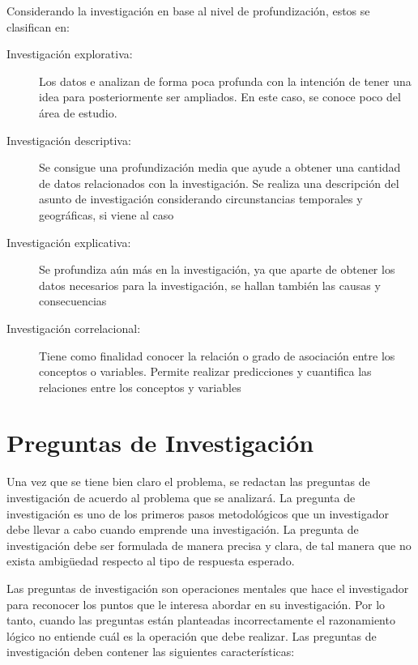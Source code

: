 Considerando la investigación en base al nivel de profundización, estos se clasifican en:

\begin{description}

    \item[Investigación explorativa:] Los datos e analizan de forma poca profunda con la intención de tener una idea para posteriormente ser ampliados. En este caso, se conoce poco del área de estudio.

    \item[Investigación descriptiva:] Se consigue una profundización media que ayude a obtener una cantidad de datos relacionados con la investigación. Se realiza una descripción del asunto de investigación considerando circunstancias temporales y geográficas, si viene al caso
    
    \item[Investigación explicativa:] Se profundiza aún más en la investigación, ya que aparte de obtener los datos necesarios para la investigación, se hallan también las causas y consecuencias
    
    \item[Investigación correlacional:] Tiene como finalidad conocer la relación o grado de asociación entre los conceptos o variables. Permite realizar predicciones y cuantifica las relaciones entre los conceptos y variables

\end{description}

\section{Preguntas de Investigación}
Una vez que se tiene bien claro el problema, se redactan las preguntas de investigación de acuerdo al problema que se analizará. La pregunta de investigación es uno de los primeros pasos metodológicos que un investigador debe llevar a cabo cuando emprende una investigación.
La pregunta de investigación debe ser formulada de manera precisa y clara, de tal manera que no exista ambigüedad respecto al tipo de respuesta esperado.\newline

Las preguntas de investigación son operaciones mentales que hace el investigador para reconocer los puntos que le interesa abordar en su investigación. Por lo tanto, cuando las preguntas están planteadas incorrectamente el razonamiento lógico no entiende cuál es la operación que debe realizar. Las preguntas de investigación deben contener las siguientes características:

